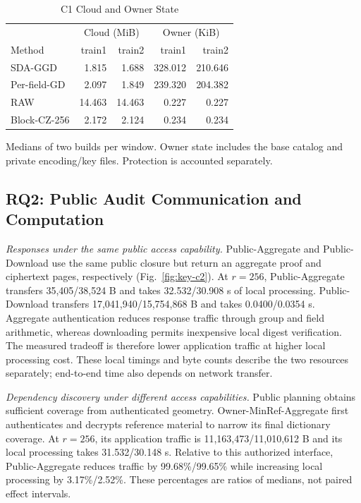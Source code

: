 \documentclass[10pt,journal]{IEEEtran}
\newcommand{\tabnote}[1]{\par\smallskip\parbox{\linewidth}{\footnotesize #1}}
\begin{document}
\begin{table}[t]\centering\small
\caption{C1 Cloud and Owner State}\label{tab:state}
\begin{tabular}{@{}lrrrr@{}}\toprule
& \multicolumn{2}{c}{Cloud (MiB)} & \multicolumn{2}{c}{Owner (KiB)}\\
Method & train1 & train2 & train1 & train2\\\midrule
SDA-GGD & 1.815 & 1.688 & 328.012 & 210.646\\
Per-field-GD & 2.097 & 1.849 & 239.320 & 204.382\\
RAW & 14.463 & 14.463 & 0.227 & 0.227\\
Block-CZ-256 & 2.172 & 2.124 & 0.234 & 0.234\\
\bottomrule\end{tabular}
\tabnote{Medians of two builds per window. Owner state includes the base catalog and private encoding/key files. Protection is accounted separately.}
\end{table}

\subsection{RQ2: Public Audit Communication and Computation}
\emph{Responses under the same public access capability.}
Public-Aggregate and Public-Download use the same public closure but return
an aggregate proof and ciphertext pages, respectively (Fig.~\ref{fig:key-c2}).
At $r=256$, Public-Aggregate transfers 35,405/38,524 B and takes
32.532/30.908 s of local processing. Public-Download transfers
17,041,940/15,754,868 B and takes 0.0400/0.0354 s.
Aggregate authentication reduces response traffic through group and field
arithmetic, whereas downloading permits inexpensive local digest verification.
The measured tradeoff is therefore lower application traffic at higher local
processing cost. These local timings and byte counts describe the two
resources separately; end-to-end time also depends on network transfer.

\emph{Dependency discovery under different access capabilities.}
Public planning obtains sufficient coverage from authenticated geometry.
Owner-MinRef-Aggregate first authenticates and decrypts reference material
to narrow its final dictionary coverage. At $r=256$, its application traffic
is 11,163,473/11,010,612 B and its local processing takes 31.532/30.148 s.
Relative to this authorized interface, Public-Aggregate reduces traffic by
99.68\%/99.65\% while increasing local processing by 3.17\%/2.52\%.
These percentages are ratios of medians, not paired effect intervals.
\end{document}
